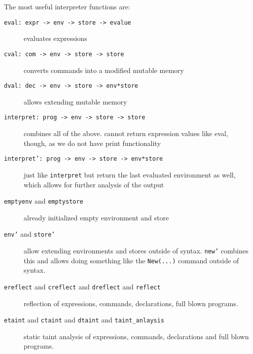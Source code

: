 \documentclass[11pt]{article}
\begin{document}
The most useful interpreter functions are:
\begin{description}
\item[{\texttt{eval: expr -> env -> store -> evalue}}] evaluates expressions
\item[{\texttt{cval: com -> env -> store -> store}}] converts commands into a modified mutable memory
\item[{\texttt{dval: dec -> env -> store -> env*store}}] allows extending mutable memory
\item[{\texttt{interpret: prog -> env -> store -> store} }] combines all of the above. cannot return expression values like eval, though, as we do not have print
functionality
\item[{\texttt{interpret': prog -> env -> store -> env*store} }] just like \texttt{interpret} but return the last evaluated environment as well, which allows for further 
analysis of the output
\item[{\texttt{emptyenv} and \texttt{emptystore}}] already initialized empty environment and store
\item[{\texttt{env'} and \texttt{store'}}] allow extending environments and stores outside of syntax. \texttt{new'} combines this and allows doing something like the \texttt{New(...)} command outside of syntax.
\item[{\texttt{ereflect} and \texttt{creflect} and \texttt{dreflect} and \texttt{reflect}}] reflection of expressions, commands, declarations, full blown programs.
\item[{\texttt{etaint} and \texttt{ctaint} and \texttt{dtaint} and \texttt{taint\_anlaysis}}] static taint analysis of expressions, commands, declarations and full blown programs.
\end{description}
\end{document}
